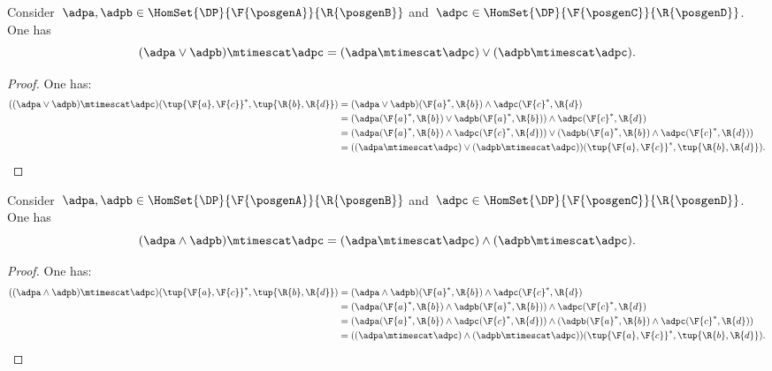 {\begin{lemma}
    \label{lem:times_vee}
    Consider~$\adpa,\adpb\in \HomSet{\DP}{\F{\posgenA}}{\R{\posgenB}}$ and~$\adpc\in \HomSet{\DP}{\F{\posgenC}}{\R{\posgenD}}$. One has
    \begin{equation*}
        (\adpa \vee \adpb)\mtimescat \adpc=(\adpa \mtimescat \adpc) \vee (\adpb\mtimescat \adpc).
    \end{equation*}
\end{lemma}
\begin{proof}
    One has:
    \begin{equation*}
        \begin{aligned}
            ((\adpa \vee \adpb)\mtimescat \adpc)(\tup{\F{a},\F{c}}^*,\tup{\R{b},\R{d}})&=
            (\adpa \vee \adpb)(\F{a}^*,\R{b})\wedge \adpc(\F{c}^*,\R{d})\\
            &=(\adpa(\F{a}^*,\R{b}) \vee \adpb(\F{a}^*,\R{b}))\wedge \adpc(\F{c}^*,\R{d})\\
            &=(\adpa(\F{a}^*,\R{b}) \wedge  \adpc(\F{c}^*,\R{d})) \vee (\adpb(\F{a}^*,\R{b})\wedge \adpc(\F{c}^*,\R{d}))\\
            &=((\adpa \mtimescat \adpc) \vee (\adpb\mtimescat \adpc))(\tup{\F{a},\F{c}}^*,\tup{\R{b},\R{d}}).
        \end{aligned}
    \end{equation*}
\end{proof}

\begin{lemma}
    \label{lem:times_wedge}
    Consider~$\adpa,\adpb\in \HomSet{\DP}{\F{\posgenA}}{\R{\posgenB}}$ and~$\adpc\in \HomSet{\DP}{\F{\posgenC}}{\R{\posgenD}}$. One has
    \begin{equation*}
        (\adpa \wedge \adpb)\mtimescat \adpc=(\adpa \mtimescat \adpc) \wedge (\adpb\mtimescat \adpc).
    \end{equation*}
\end{lemma}
\begin{proof}
    One has:
    \begin{equation*}
        \begin{aligned}
            ((\adpa \wedge \adpb)\mtimescat \adpc)(\tup{\F{a},\F{c}}^*,\tup{\R{b},\R{d}})&=
            (\adpa \wedge \adpb)(\F{a}^*,\R{b})\wedge \adpc(\F{c}^*,\R{d})\\
            &=(\adpa(\F{a}^*,\R{b}) \wedge \adpb(\F{a}^*,\R{b}))\wedge \adpc(\F{c}^*,\R{d})\\
            &=(\adpa(\F{a}^*,\R{b}) \wedge  \adpc(\F{c}^*,\R{d})) \wedge (\adpb(\F{a}^*,\R{b})\wedge \adpc(\F{c}^*,\R{d}))\\
            &=((\adpa \mtimescat \adpc) \wedge (\adpb\mtimescat \adpc))(\tup{\F{a},\F{c}}^*,\tup{\R{b},\R{d}}).
        \end{aligned}
    \end{equation*}
\end{proof}


}
